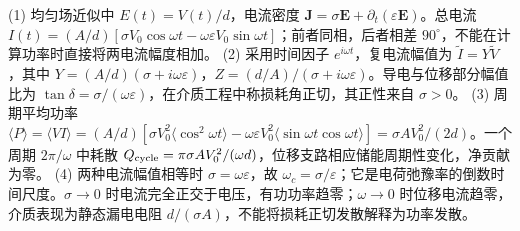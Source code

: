 (1) 均匀场近似中 \(E(t)=V(t)/d\)，电流密度 \(\mathbf J=\sigma\mathbf E+\partial_t(\varepsilon\mathbf E)\)。总电流 \(I(t)=(A/d)[\sigma V_0\cos\omega t-\omega\varepsilon V_0\sin\omega t]\)；前者同相，后者相差 \(90^\circ\)，不能在计算功率时直接将两电流幅度相加。
(2) 采用时间因子 \(e^{i\omega t}\)，复电流幅值为 \(\tilde I=Y\tilde V\)，其中 \(Y=(A/d)(\sigma+i\omega\varepsilon)\)，\(Z=(d/A)/(\sigma+i\omega\varepsilon)\)。导电与位移部分幅值比为 \(\tan\delta=\sigma/(\omega\varepsilon)\)，在介质工程中称损耗角正切，其正性来自 \(\sigma>0\)。
(3) 周期平均功率 \(\langle P\rangle=\langle VI\rangle=(A/d)[\sigma V_0^2\langle\cos^2\omega t\rangle-\omega\varepsilon V_0^2\langle\sin\omega t\cos\omega t\rangle]=\sigma AV_0^2/(2d)\)。一个周期 \(2\pi/\omega\) 中耗散 \(Q_{\rm cycle}=\pi\sigma AV_0^2/(\omega d)\)，位移支路相应储能周期性变化，净贡献为零。
(4) 两种电流幅值相等时 \(\sigma=\omega\varepsilon\)，故 \(\omega_c=\sigma/\varepsilon\)；它是电荷弛豫率的倒数时间尺度。\(\sigma\to0\) 时电流完全正交于电压，有功功率趋零；\(\omega\to0\) 时位移电流趋零，介质表现为静态漏电电阻 \(d/(\sigma A)\)，不能将损耗正切发散解释为功率发散。
